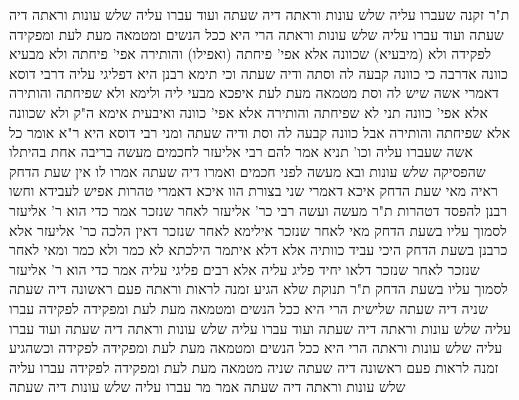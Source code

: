 \documentclass[12pt, openany]{book}
\begin{document}
{ת"ר  זקנה שעברו עליה שלש עונות וראתה דיה שעתה ועוד עברו עליה שלש עונות וראתה דיה שעתה ועוד עברו עליה שלש עונות וראתה הרי היא ככל הנשים ומטמאה מעת לעת ומפקידה לפקידה 
ולא (מיבעיא) שכוונה אלא אפי' פיחתה (ואפילו) והותירה 
אפי' פיחתה ולא מבעיא כוונה  אדרבה כי כוונה קבעה לה וסתה ודיה שעתה 
וכי תימא  רבנן היא דפליגי עליה דרבי דוסא דאמרי אשה שיש לה וסת מטמאה מעת לעת איפכא מבעי ליה ולימא  ולא שפיחתה והותירה אלא אפי' כוונה 
תני  לא שפיחתה והותירה אלא אפי' כוונה  ואיבעית אימא ה"ק  ולא שכוונה אלא שפיחתה והותירה אבל כוונה קבעה לה וסת ודיה שעתה ומני רבי דוסא היא
ר"א אומר כל אשה שעברו עליה וכו' תניא אמר להם רבי אליעזר לחכמים  מעשה בריבה אחת בהיתלו שהפסיקה שלש עונות ובא מעשה לפני חכמים ואמרו דיה שעתה 
אמרו לו  אין שעת הדחק ראיה  מאי שעת הדחק  איכא דאמרי  שני בצורת הוו איכא דאמרי  טהרות אפיש לעבידא וחשו רבנן להפסד דטהרות 
ת"ר מעשה ועשה רבי כר' אליעזר לאחר שנזכר אמר  כדי הוא ר' אליעזר לסמוך עליו בשעת הדחק  מאי לאחר שנזכר  אילימא לאחר שנזכר דאין הלכה כר' אליעזר אלא כרבנן בשעת הדחק היכי עביד כוותיה 
אלא דלא איתמר הילכתא לא כמר ולא כמר ומאי לאחר שנזכר לאחר שנזכר דלאו יחיד פליג עליה אלא רבים פליגי עליה אמר  כדי הוא ר' אליעזר לסמוך עליו בשעת הדחק 
ת"ר  תנוקת שלא הגיע זמנה לראות וראתה פעם ראשונה דיה שעתה שניה דיה שעתה שלישית הרי היא ככל הנשים ומטמאה מעת לעת ומפקידה לפקידה 
עברו עליה שלש עונות וראתה דיה שעתה ועוד עברו עליה שלש עונות וראתה דיה שעתה ועוד עברו עליה שלש עונות וראתה הרי היא ככל הנשים ומטמאה מעת לעת ומפקידה לפקידה
וכשהגיע זמנה לראות פעם ראשונה דיה שעתה שניה מטמאה מעת לעת ומפקידה לפקידה עברו עליה שלש עונות וראתה דיה שעתה 
אמר מר  עברו עליה שלש עונות דיה שעתה}
\end{document}
